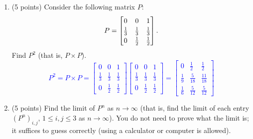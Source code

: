 \documentclass{article}
\begin{document}
\begin{enumerate}[label=(\alph*)]
    \item (5 points) Consider the following matrix $P$:
    \[
    P =
    \renewcommand{\arraystretch}{1.2}
    \begin{bmatrix}
        0 & 0 & 1 \\
        \frac{1}{3} & \frac{1}{3} & \frac{1}{3} \\
        0 & \frac{1}{2} & \frac{1}{2}
    \end{bmatrix}.
    \]
    Find $P^2$ (that is, $P \times P$).
    \renewcommand{\arraystretch}{1.2}
    \textcolor{blue}{$$P^2=P\times P = \begin{bmatrix}
        0 & 0 & 1 \\
        \frac{1}{3} & \frac{1}{3} & \frac{1}{3} \\
        0 & \frac{1}{2} & \frac{1}{2}
    \end{bmatrix} \begin{bmatrix}
        0 & 0 & 1 \\
        \frac{1}{3} & \frac{1}{3} & \frac{1}{3} \\
        0 & \frac{1}{2} & \frac{1}{2}
    \end{bmatrix}= \begin{bmatrix}
        0 & \frac{1}{2} & \frac{1}{2} \\
        \frac{1}{9} & \frac{5}{18} & \frac{11}{18} \\
        \frac{1}{6} & \frac{5}{12} & \frac{5}{12}
    \end{bmatrix}$$}

    \item (5 points) Find the limit of $P^n$ as $n \to \infty$ (that is, find the limit of each entry $(P^n)_{i,j}$, $1 \leq i,j \leq 3$ as $n \to \infty$). You do not need to prove what the limit is; it suffices to guess correctly (using a calculator or computer is allowed).


\end{enumerate}
\end{document}
